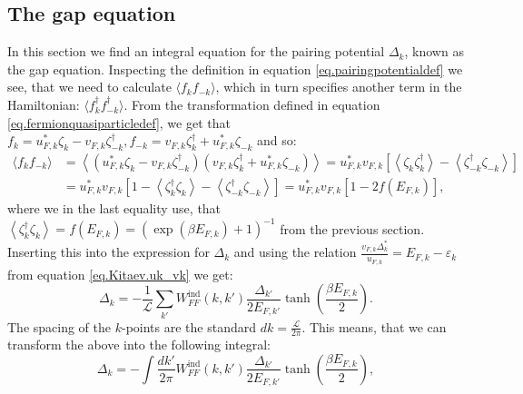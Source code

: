 \subsection{The gap equation} \label{subsec.pairingpotential.integralequation}
In this section we find an integral equation for the pairing potential $\Delta_k$, known as the gap equation. Inspecting the definition in equation \eqref{eq.pairingpotentialdef} we see, that we need to calculate $\langle f_k f_{-k} \rangle$, which in turn specifies another term in the Hamiltonian: $\langle f^\dagger_k f^\dagger_{-k} \rangle$. From the transformation defined in equation \eqref{eq.fermionquasiparticledef}, we get that $f_k = u^*_{F,k}\zeta_k - v_{F,k}\zeta^\dagger_{-k}, f_{-k} = v_{F,k}\zeta^\dagger_k + u^*_{F,k}\zeta_{-k}$ and so:
\begin{align}
\langle f_k f_{-k} \rangle &= \left \langle (u^*_{F,k}\zeta_k - v_{F,k}\zeta^\dagger_{-k}) (v_{F,k}\zeta^\dagger_k + u^*_{F,k}\zeta_{-k}) \right \rangle = u^*_{F,k}v_{F,k}\left[ \left \langle \zeta_k \zeta^\dagger_{k} \right \rangle - \left \langle \zeta^\dagger_{-k} \zeta_{-k} \right \rangle \right]  \nonumber \\
& =  u^*_{F,k}v_{F,k}\left[ 1 - \left \langle \zeta^\dagger_{k} \zeta_k \right \rangle - \left \langle \zeta^\dagger_{-k} \zeta_{-k} \right \rangle \right] = u^*_{F,k}v_{F,k}\left[1 - 2f(E_{F,k})\right], \nonumber
\end{align}
where we in the last equality use, that $\left \langle \zeta^\dagger_{k} \zeta_{k} \right \rangle = f(E_{F,k})=(\exp(\beta E_{F,k})+1)^{-1} $ from the previous section. Inserting this into the expression for $\Delta_k$ and using the relation $\frac{v_{F,k}\Delta^*_k}{u_{F,k}}=E_{F,k}-\varepsilon_k$ from equation \eqref{eq.Kitaev.uk_vk} we get:
\begin{equation}
\Delta_k = - \frac{1}{\mathcal{L}}\sum_{k'} W^\text{ind}_{FF}(k,k')\frac{\Delta_{k'}}{2E_{F,k'}}\tanh\left(\frac{\beta E_{F,k}}{2}\right).
\label{eq.GapequationSum}
\end{equation} 
The spacing of the $k$-points are the standard $dk = \frac{\mathcal{L}}{2\pi}$. This means, that we can transform the above into the following integral:
\begin{equation}
\Delta_k = - \int \frac{dk'}{2\pi} W^\text{ind}_{FF}(k,k')\frac{\Delta_{k'}}{2E_{F,k'}}\tanh\left(\frac{\beta E_{F,k}}{2}\right),
\label{eq.GapequationIntegral}
\end{equation} 
